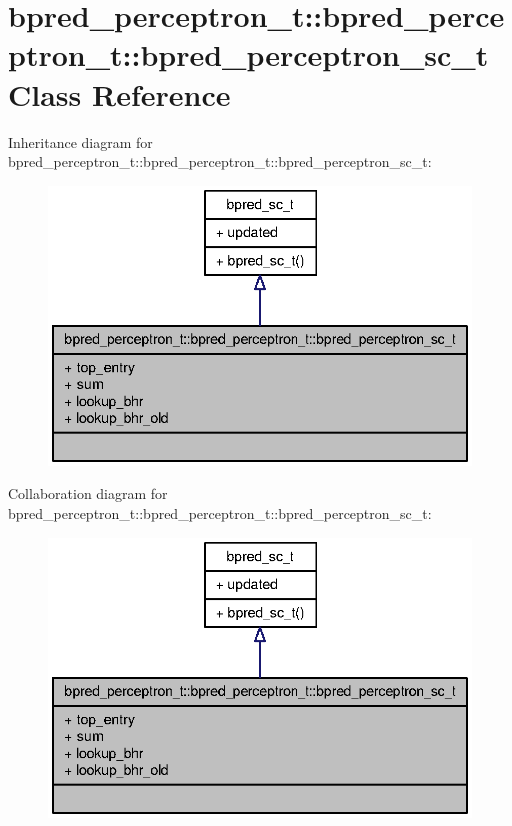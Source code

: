 \section{bpred\_\-perceptron\_\-t::bpred\_\-perceptron\_\-t::bpred\_\-perceptron\_\-sc\_\-t Class Reference}
\label{classbpred__perceptron__t_1_1bpred__perceptron__sc__t}
Inheritance diagram for bpred\_\-perceptron\_\-t::bpred\_\-perceptron\_\-t::bpred\_\-perceptron\_\-sc\_\-t:\nopagebreak
\begin{figure}[H]
\begin{center}
\leavevmode
\includegraphics[width=338pt]{classbpred__perceptron__t_1_1bpred__perceptron__sc__t__inherit__graph}
\end{center}
\end{figure}
Collaboration diagram for bpred\_\-perceptron\_\-t::bpred\_\-perceptron\_\-t::bpred\_\-perceptron\_\-sc\_\-t:\nopagebreak
\begin{figure}[H]
\begin{center}
\leavevmode
\includegraphics[width=338pt]{classbpred__perceptron__t_1_1bpred__perceptron__sc__t__coll__graph}
\end{center}
\end{figure}
